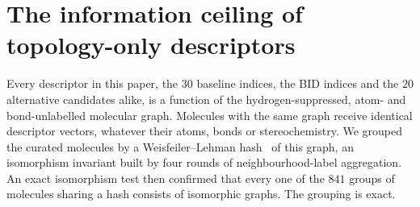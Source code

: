 \documentclass[11pt,a4paper]{article}
\theoremstyle{definition}
\begin{document}
\section{The information ceiling of topology-only descriptors}\label{sec:ceiling}

Every descriptor in this paper, the $30$ baseline indices, the BID
indices and the $20$ alternative candidates alike, is a function of
the hydrogen-suppressed, atom- and bond-unlabelled molecular graph.
Molecules with the same graph receive identical descriptor vectors,
whatever their atoms, bonds or stereochemistry. We grouped the curated
molecules by a Weisfeiler--Lehman hash~\cite{Shervashidze2011WL} of
this graph, an isomorphism invariant built by four rounds of
neighbourhood-label aggregation.
An exact isomorphism test then confirmed that every one of the $841$
groups of molecules sharing a hash consists of isomorphic graphs. The
grouping is exact.
\end{document}
